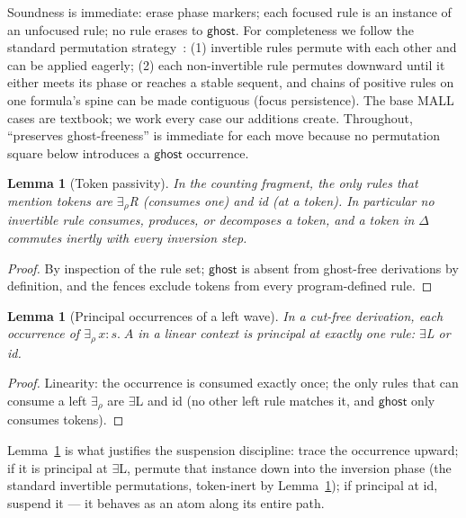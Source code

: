 \documentclass[11pt]{article}
\newcommand{\erho}[2]{\exists_{\rho}\, #1{:}#2.\;} %
\newcommand{\ghost}{\mathsf{ghost}}
\newtheorem{lemma}[theorem]{Lemma}
\theoremstyle{definition}
\theoremstyle{remark}
\begin{document}
Soundness is immediate: erase phase markers; each focused rule is an
instance of an unfocused rule; no rule erases to $\ghost$.  For
completeness we follow the standard permutation
strategy~\cite{Andreoli1992,Laurent2004,MillerSaurin2007,Simmons2014}:
(1) invertible rules permute with each other and can be applied
eagerly; (2) each non-invertible rule permutes downward until it either
meets its phase or reaches a stable sequent, and chains of positive
rules on one formula's spine can be made contiguous (focus
persistence).  The base MALL cases are textbook; we work every case our
additions create.  Throughout, ``preserves ghost-freeness'' is
immediate for each move because no permutation square below introduces
a $\ghost$ occurrence.

\begin{lemma}[Token passivity]\label{lem:passivity}
In the counting fragment, the only rules that mention tokens are
$\exists_\rho$R (consumes one) and id (at a token).  In particular no
invertible rule consumes, produces, or decomposes a token, and a token
in $\Delta$ commutes inertly with every inversion step.
\end{lemma}

\begin{proof}
By inspection of the rule set; $\ghost$ is absent from ghost-free
derivations by definition, and the fences exclude tokens from every
program-defined rule.
\end{proof}

\begin{lemma}[Principal occurrences of a left wave]\label{lem:leftwave}
In a cut-free derivation, each occurrence of $\erho{x}{s}A$ in a linear
context is principal at exactly one rule: $\exists$L or id.
\end{lemma}

\begin{proof}
Linearity: the occurrence is consumed exactly once; the only rules
that can consume a left $\exists_\rho$ are $\exists$L and id (no other
left rule matches it, and $\ghost$ only consumes tokens).
\end{proof}

Lemma~\ref{lem:leftwave} is what justifies the suspension discipline:
trace the occurrence upward; if it is principal at $\exists$L, permute
that instance down into the inversion phase (the standard invertible
permutations, token-inert by Lemma~\ref{lem:passivity}); if principal
at id, suspend it --- it behaves as an atom along its entire path.
\end{document}
